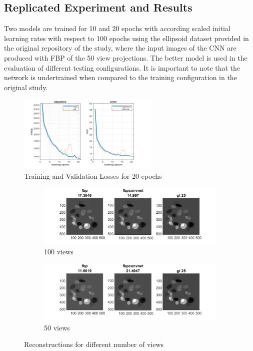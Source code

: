 \documentclass[journal, onecolumn, 11pt]{IEEEtran}
\begin{document}
\clearpage

\subsection{Replicated Experiment and Results} \label{subsec:training}

Two models are trained for 10 and 20 epochs with according scaled initial learning rates with respect to 100 epochs using the ellipsoid dataset provided in the original repository of the study, where the input images of the CNN are produced with FBP of the 50 view projections. The better model is used in the evaluation of different testing configurations. It is important to note that the network is undertrained when compared to the training configuration in the original study. 

\begin{figure}[h]
\centering
\includegraphics[width=0.6\textwidth]{images/training.png}
\caption{Training and Validation Losses for 20 epochs}\label{fig:training}
\end{figure}


\begin{figure}[h]
\centering
\begin{subfigure}[b]{0.8\linewidth}
\centering
\includegraphics[width=\textwidth]{images/reprec10.png}
\caption{100 views}\label{subfig:2a}
\end{subfigure}
\begin{subfigure}[b]{0.8\linewidth}
\centering
\includegraphics[width=\textwidth]{images/reprec20.png}
\caption{50 views}\label{subfig:2b}
\end{subfigure}
\caption{Reconstructions for different number of views}
\label{fig:reprecs}
\end{figure}
\end{document}
